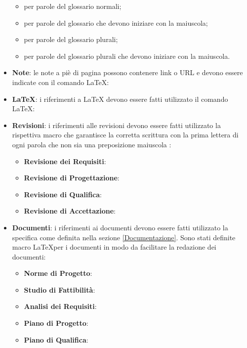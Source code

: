 \documentclass[12pt,a4paper]{article}
\begin{document}
\begin{itemize}
	\begin{itemize}
		\item {} per parole del glossario normali;
		\item {} per parole del glossario che devono iniziare con la maiuscola;
		\item {} per parole del glossario plurali;
		\item {} per parole del glossario plurali che devono iniziare con la maiuscola.
	\end{itemize}
	\item \textbf{Note}: le note a piè di pagina possono contenere link o URL e devono essere indicate con il comando \LaTeX: 
	\item \textbf{\LaTeX}: i riferimenti a \LaTeX{} devono essere fatti utilizzato il comando \LaTeX: 
	\item \textbf{Revisioni}: i riferimenti alle revisioni devono essere fatti utilizzato la rispettiva macro che garantisce la corretta scrittura con la prima lettera di ogni parola che non sia una preposizione maiuscola :
	\begin{itemize}
		\item \textbf{Revisione dei Requisiti}: 
		\item \textbf{Revisione di Progettazione}: 
		\item \textbf{Revisione di Qualifica}: 
		\item \textbf{Revisione di Accettazione}: 
	\end{itemize}
	\item \textbf{Documenti}: i riferimenti ai documenti devono essere fatti utilizzato la specifica come definita nella sezione \ref{Documentazione}. Sono stati definite macro  \LaTeX per i documenti in modo da facilitare la redazione dei documenti:
	\begin{itemize}
		\item \textbf{Norme di Progetto}: 
		\item \textbf{Studio di Fattibilità}: 
		\item \textbf{Analisi dei Requisiti}: 
		\item \textbf{Piano di Progetto}: 
		\item \textbf{Piano di Qualifica}: 

\end{itemize}
\end{itemize}
\end{document}
